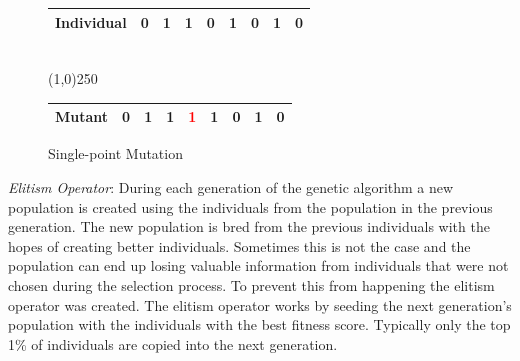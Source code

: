 \begin{figure}[H]
  \centering
  \begin{tabular}{ | p{2cm} | l | l | l | l | l | l | l | l | }
    \hline
    Individual & 0 & 1 & 1 & 0 & 1 & 0 & 1 & 0 \\
    \hline
  \end{tabular}
  \\
  \vspace{3 mm}
  \line(1,0){250}
  \\
  \vspace{3 mm}
  \begin{tabular}{ | p{2cm} | l | l | l | l | l | l | l | l | }
    \hline
    Mutant & 0 & 1 & 1 & \textcolor{red}{1} & 1 & 0 & 1 & 0 \\
    \hline
  \end{tabular}
  \caption{Single-point Mutation}
  \label{fig:mutation}
\end{figure}

\textit{Elitism Operator}: During each generation of the genetic algorithm a new population is created using the individuals from the population in the previous generation. The new population is bred from the previous individuals with the hopes of creating better individuals. Sometimes this is not the case and the population can end up losing valuable information from individuals that were not chosen during the selection process. To prevent this from happening the elitism operator was created. The elitism operator works by seeding the next generation's population with the individuals with the best fitness score. Typically only the top 1\% of individuals are copied into the next generation.